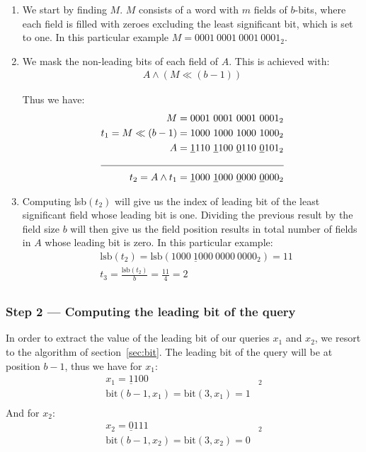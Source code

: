 \begin{enumerate}
    \item
    We start by finding $M$. $M$ consists of a word with $m$ fields of $b$-bits, where each field is filled with zeroes excluding the least significant bit, which is set to one. In this particular example $M = 0001\ 0001\ 0001\ 0001_2$.
    
    \item %
    We mask the non-leading bits of each field of $A$. This is achieved with:
    \begin{align*}
        A \wedge (M \ll (b - 1))
    \end{align*}
    
    Thus we have:
    \begin{align*}
        M &= 0001\ 0001\ 0001\ 0001_2 \\
        t_1 = M \ll (b - 1) &= 1000\ 1000\ 1000\ 1000_2 \\
        A &= \underline{1}110\ \underline{1}100\ \underline{0}110\ \underline{0}101_2 \\
        \cline{1-2}
        t_2 = A \wedge t_1 &= \underline{1}000\ \underline{1}000\ \underline{0}000\ \underline{0}000_2
    \end{align*}
    
    \item
    Computing lsb$(t_2)$ will give us the index of leading bit of the least significant field whose leading bit is one. Dividing the previous result by the field size $b$ will then give us the  field position results in total number of fields in $A$ whose leading bit is zero. In this particular example:
    \begin{align*}
        &\text{lsb}(t_2) = \text{lsb}(1000\ \underline{1}000\ 0000\ 0000_2) = 11 \\
        &t_3 = \frac{\text{lsb}(t_2)}{b} = \frac{11}{4} = 2 \\
    \end{align*}
\end{enumerate}

\subsubsection{Step 2 --- Computing the leading bit of the query}
In order to extract the value of the leading bit of our queries $x_1$ and $x_2$, we resort to the algorithm of section~\ref{sec:bit}. The leading bit of the query will be at position $b - 1$, thus we have for $x_1$:
\begin{align*}
    x_1 = \underline{1}100&_2\\
    \text{bit}(b - 1, x_1) = \text{bit}(3, x_1) = 1\\
\end{align*}
And for $x_2$:
\begin{align*}
    x_2 = \underline{0}111&_2\\
    \text{bit}(b - 1, x_2) = \text{bit}(3, x_2) = 0\\
\end{align*}

